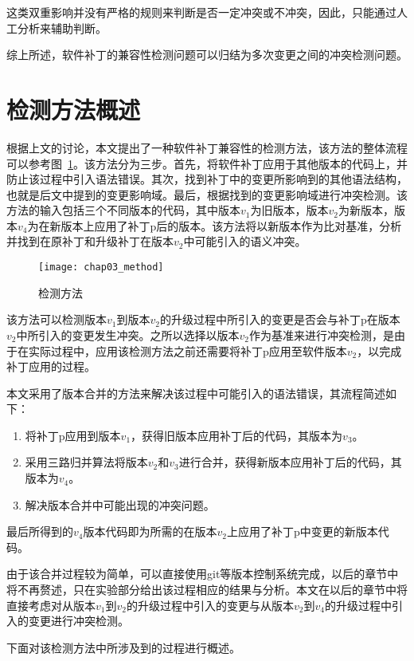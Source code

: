 这类双重影响并没有严格的规则来判断是否一定冲突或不冲突，因此，只能通过人工分析来辅助判断。

综上所述，软件补丁的兼容性检测问题可以归结为多次变更之间的冲突检测问题。

\section{检测方法概述}
\label {sec_method}

根据上文的讨论，本文提出了一种软件补丁兼容性的检测方法，该方法的整体流程可以参考图~\ref{all_flow}。该方法分为三步。首先，将软件补丁应用于其他版本的代码上，并防止该过程中引入语法错误。其次，找到补丁中的变更所影响到的其他语法结构，也就是后文中提到的变更影响域。最后，根据找到的变更影响域进行冲突检测。该方法的输入包括三个不同版本的代码，其中版本$v_1$为旧版本，版本$v_2$为新版本，版本$v_4$为在新版本上应用了补丁p后的版本。该方法将以新版本作为比对基准，分析并找到在原补丁和升级补丁在版本$v_2$中可能引入的语义冲突。

\begin{figure}[H]
	\centering
	\texttt{[image: chap03\_method]}
	\caption {检测方法}
	\label {all_flow}	
\end{figure}

该方法可以检测版本$v_1$到版本$v_2$的升级过程中所引入的变更是否会与补丁p在版本$v_2$中所引入的变更发生冲突。之所以选择以版本$v_2$作为基准来进行冲突检测，是由于在实际过程中，应用该检测方法之前还需要将补丁p应用至软件版本$v_2$，以完成补丁应用的过程。

本文采用了版本合并的方法来解决该过程中可能引入的语法错误，其流程简述如下：
\begin{enumerate}
	\item 将补丁p应用到版本$v_1$，获得旧版本应用补丁后的代码，其版本为$v_3$。
	\item 采用三路归并算法将版本$v_2$和$v_3$进行合并，获得新版本应用补丁后的代码，其版本为$v_4$。
	\item 解决版本合并中可能出现的冲突问题。
\end{enumerate}

最后所得到的$v_4$版本代码即为所需的在版本$v_2$上应用了补丁p中变更的新版本代码。

由于该合并过程较为简单，可以直接使用git等版本控制系统完成，以后的章节中将不再赘述，只在实验部分给出该过程相应的结果与分析。本文在以后的章节中将直接考虑对从版本$v_1$到$v_2$的升级过程中引入的变更与从版本$v_2$到$v_4$的升级过程中引入的变更进行冲突检测。

下面对该检测方法中所涉及到的过程进行概述。

